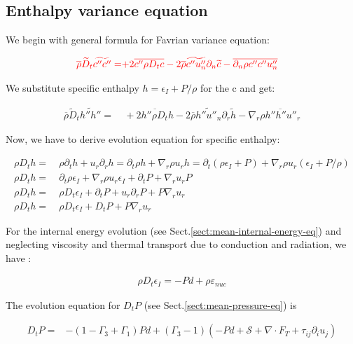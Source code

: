 \documentclass[10pt,paper=a4]{report}
\newcommand{\eht}{\overline}
\newcommand{\fht}{\widetilde}
\begin{document}
\subsection{Enthalpy variance equation}

\noindent
We begin with general formula for Favrian variance equation:

\begin{align}
{\color{red}\eht{\rho}\fht{D}_t \fht{c''c''} =} & {\color{red}+2 \eht{c''\rho D_t c} - 2\eht{\rho}\fht{c''u''_n}\partial_n\fht{c} - \eht{\partial_n{\rho c''c'' u''_n}}} 
\end{align}

\noindent
We substitute specific enthalpy $h = \epsilon_I + P/ \rho$ for the c and get:

\begin{align}
\eht{\rho} \fht{D}_t \fht{h''h''} = & \ +\eht{2 h'' \rho D_t h} - 2 \eht{\rho} \fht{h''u''_n}\partial_r \fht{h} - \nabla_r \eht{\rho h''h''u''_r}
\end{align}  

\noindent
Now, we have to derive evolution equation for specific enthalpy:

\begin{align}
  \rho D_t h = & \ \rho \partial_t h + u_r \partial_r h = \partial_t \rho h + \nabla_r \rho u_r h = \partial_t (\rho \epsilon_I + P) + \nabla_r \rho u_r (\epsilon_I + P/ \rho) \\
  \rho D_t h = & \ \partial_t \rho \epsilon_I + \nabla_r \rho u_r \epsilon_I + \partial_t P + \nabla_r u_r P \\
  \rho D_t h = & \ \rho D_t \epsilon_I + \partial_t P + u_r \partial_r P + P\nabla_r u_r \\
  \rho D_t h = & \ \rho D_t \epsilon_I + D_t P + P\nabla_r u_r   
\end{align}  

\noindent
For the internal energy evolution (see Sect.\ref{sect:mean-internal-energy-eq}) and neglecting viscosity and thermal transport due to conduction and radiation, we have :

\begin{align}
\rho D_t \epsilon_I = -P d + \rho \varepsilon_{nuc}
\end{align}  

\noindent
The evolution equation for $D_t P$ (see Sect.\ref{sect:mean-pressure-eq}) is 

\begin{align}
D_t P = & -(1-\Gamma_3+\Gamma_1)Pd + (\Gamma_3 -1)(-Pd + {\mathcal S} + \nabla \cdot F_T + \tau_{ij}\partial_i u_j)
\end{align}
\end{document}
